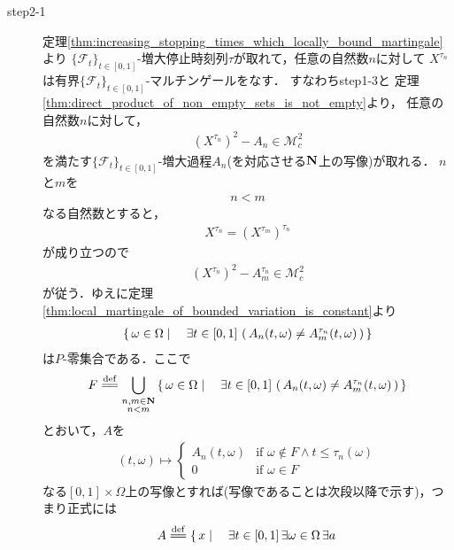 \begin{sketch}
\begin{description}
			\item[step2-1]
				定理\ref{thm:increasing_stopping_times_which_locally_bound_martingale}より
				$\{\mathscr{F}_{t}\}_{t \in [0,1]}$-増大停止時刻列$\tau$が取れて，任意の自然数$n$に対して
				$X^{\tau_{n}}$は有界$\{\mathscr{F}_{t}\}_{t \in [0,1]}$-マルチンゲールをなす．
				すなわちstep1-3と
				定理\ref{thm:direct_product_of_non_empty_sets_is_not_empty}より，
				任意の自然数$n$に対して，
				\begin{align}
					\left(X^{\tau_{n}}\right)^{2} - A_{n} \in \mathscr{M}^{2}_{c}
				\end{align}
				を満たす$\{\mathscr{F}_{t}\}_{t \in [0,1]}$-増大過程$A_{n}$(を対応させる$\mathbf{N}$上の写像)が取れる．
				$n$と$m$を
				\begin{align}
					n < m
				\end{align}
				なる自然数とすると，
				\begin{align}
					X^{\tau_{n}} = \left(X^{\tau_{m}}\right)^{\tau_{n}}
				\end{align}
				が成り立つので
				\begin{align}
					\left(X^{\tau_{n}}\right)^{2} - A_{m}^{\tau_{n}} \in \mathscr{M}_{c}^{2}
				\end{align}
				が従う．ゆえに定理\ref{thm:local_martingale_of_bounded_variation_is_constant}より
				\begin{align}
					\left\{\, \omega \in \Omega \mid \quad \exists t \in [0,1]\, \left(\, A_{n}(t,\omega) \neq A_{m}^{\tau_{n}}(t,\omega)\, \right)\, \right\}
				\end{align}
				は$P$-零集合である．ここで
				\begin{align}
					F \defeq \bigcup_{\substack{n,m \in \Natural \\ n < m}} \Set{\omega \in \Omega}{\exists t \in [0,1]\, \left(\, A_{n}(t,\omega) \neq A_{m}^{\tau_{n}}(t,\omega)\, \right)}
				\end{align}
				とおいて，$A$を
				\begin{align}
					(t,\omega) \longmapsto
					\begin{cases}
						A_{n}(t,\omega) & \mbox{if } \omega \notin F \wedge t \leq \tau_{n}(\omega) \\
						0 & \mbox{if } \omega \in F
					\end{cases}
				\end{align}
				なる$[0,1] \times \Omega$上の写像とすれば(写像であることは次段以降で示す)，つまり正式には
				\begin{align}
					A \defeq \{\, x \mid \quad 
					\exists t \in [0,1]\, \exists \omega \in \Omega\, \exists a\,

\end{align}
\end{description}
\end{sketch}
